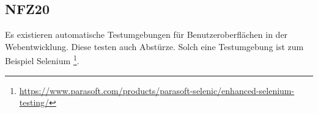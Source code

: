 \subsection*{NFZ20}

Es existieren automatische Testumgebungen für Benutzeroberflächen in der Webentwicklung.
Diese testen auch Abstürze.
Solch eine Testumgebung ist zum Beispiel Selenium \footnote{\href{https://www.parasoft.com/products/parasoft-selenic/enhanced-selenium-testing/}{https://www.parasoft.com/products/parasoft-selenic/enhanced-selenium-testing/}}.